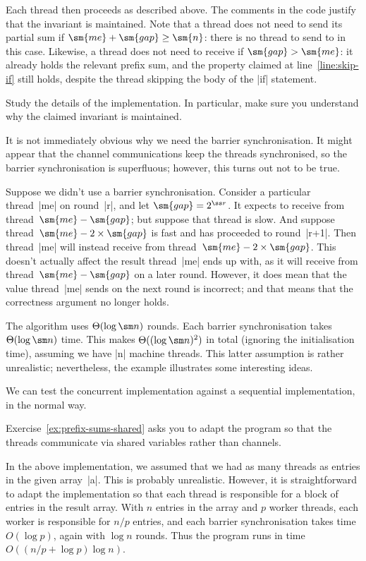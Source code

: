
Each thread then proceeds as described above.  The comments in the code
justify that the invariant is maintained.  Note that a thread does not need to
send its partial sum if $\sm{me}+\sm{gap} \ge \sm{n}$: there is no thread to
send to in this case.  Likewise, a thread does not need to receive if
$\sm{gap} > \sm{me}$: it already holds the relevant prefix sum, and the
property claimed at line~\ref{line:skip-if} still holds, despite the thread
skipping the body of the |if| statement.

\begin{instruction}
Study the details of the implementation.  In particular, make sure you
understand why the claimed invariant is maintained.
\end{instruction}

It is not immediately obvious why we need the barrier synchronisation.  It
might appear that the channel communications keep the threads synchronised, so
the barrier synchronisation is superfluous; however, this turns out not to be
true.  

Suppose we didn't use a barrier synchronisation.  Consider a particular
thread~|me| on round~|r|, and let $\sm{gap} = 2^{\ss r}$.  It expects to
receive from thread~$\sm{me}-\sm{gap}$; but suppose that thread is slow.  And
suppose thread~$\sm{me}-2 \times\sm{gap}$ is fast and has proceeded to
round~|r+1|.  Then thread~|me| will instead receive from thread~$\sm{me}-2
\times\sm{gap}$.  This doesn't actually affect the result thread~|me| ends up
with, as it will receive from thread~$\sm{me}-\sm{gap}$ on a later round.
However, it does mean that the value thread~|me| sends on the next round is
incorrect; and that means that the correctness argument no longer holds.  

The algorithm uses $\Theta(\log \sm n)$ rounds.  Each barrier synchronisation
takes $\Theta(\log \sm n)$ time.  This makes $\Theta((\log \sm n)^2)$ in total
(ignoring the initialisation time), assuming we have |n| machine threads.
This latter assumption is rather unrealistic; nevertheless, the example
illustrates some interesting ideas.

We can test the concurrent implementation against a sequential implementation,
in the normal way. 

Exercise~\ref{ex:prefix-sums-shared} asks you to adapt the program so that the
threads communicate via shared variables rather than channels.

In the above implementation, we assumed that we had as many threads as entries
in the given array~|a|.  This is probably unrealistic.  However, it is
straightforward to adapt the implementation so that each thread is responsible
for a block of entries in the result array.  With $n$ entries in the array and
$p$ worker threads, each worker is responsible for $n/p$ entries, and each
barrier synchronisation takes time $O(\log p)$, again with $\log
n$ rounds.  Thus  the
program runs in time $O((n/p + \log p) \log n)$.


